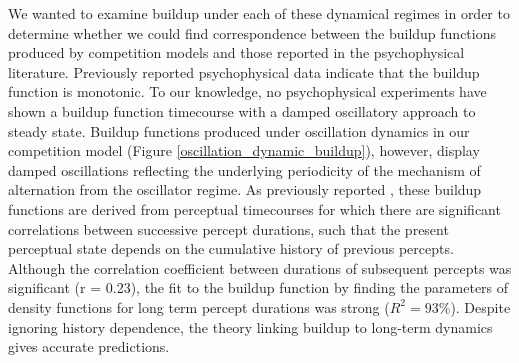 \documentclass{frontiersSCNS} %
\begin{document}
We wanted to examine buildup under each of these dynamical regimes in order to determine whether we could find correspondence between the buildup functions produced by competition models and those reported in the psychophysical literature. Previously reported psychophysical data indicate that the buildup function is monotonic. To our knowledge, no psychophysical experiments have shown a buildup function timecourse with a damped oscillatory approach to steady state. Buildup functions produced under oscillation dynamics in our competition model (Figure \ref{oscillation_dynamic_buildup}), however, display damped oscillations reflecting the underlying periodicity of the mechanism of alternation from the oscillator regime. As previously reported \cite{Shpiro2009}, these buildup functions are derived from perceptual timecourses for which there are significant correlations between successive percept durations, such that the present perceptual state depends on the cumulative history of previous percepts. Although the correlation coefficient between durations of subsequent percepts was significant (r = 0.23), the fit to the buildup function by finding the parameters of density functions for long term percept durations was strong ($R^2 = 93\%$). Despite ignoring history dependence, the theory linking buildup to long-term dynamics gives accurate predictions. 
\end{document}
